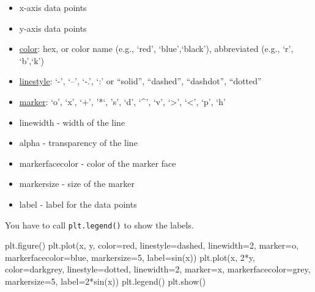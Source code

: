 \documentclass[
  letterpaper,
  DIV=11,
  numbers=noendperiod]{scrreprt}
\newenvironment{Shaded}{\begin{snugshade}}{\end{snugshade}}
\newcommand{\DecValTok}[1]{\textcolor[rgb]{0.68,0.00,0.00}{#1}}
\newcommand{\NormalTok}[1]{\textcolor[rgb]{0.00,0.23,0.31}{#1}}
\newcommand{\OperatorTok}[1]{\textcolor[rgb]{0.37,0.37,0.37}{#1}}
\newcommand{\StringTok}[1]{\textcolor[rgb]{0.13,0.47,0.30}{#1}}
\providecommand{\tightlist}{%
  \setlength{\itemsep}{0pt}\setlength{\parskip}{0pt}}\usepackage{longtable,booktabs,array}
\begin{document}
\begin{itemize}
\tightlist
\item
  x-axis data points
\item
  y-axis data points
\item
  \href{https://matplotlib.org/stable/users/explain/colors/colors.html}{color}:
  hex, or color name (e.g., `red', `blue',`black'), abbreviated (e.g.,
  `r', `b',`k')
\item
  \href{https://matplotlib.org/stable/gallery/lines_bars_and_markers/linestyles.html}{linestyle}:
  `-', `--', `-.', `:' or ``solid'', ``dashed'', ``dashdot'', ``dotted''
\item
  \href{https://matplotlib.org/stable/api/markers_api.html}{marker}:
  `o', `x', `+', '*`, 's', `d', `\^{}', `v', `\textgreater{}',
  `\textless{}', `p', `h'
\item
  linewidth - width of the line
\item
  alpha - transparency of the line
\item
  markerfacecolor - color of the marker face
\item
  markersize - size of the marker
\item
  label - label for the data points
\end{itemize}

You have to call \texttt{plt.legend()} to show the labels.

\begin{Shaded}
\begin{Highlighting}[]
\NormalTok{plt.figure()}
\NormalTok{plt.plot(x, y, color}\OperatorTok{=}\StringTok{\textquotesingle{}red\textquotesingle{}}\NormalTok{, linestyle}\OperatorTok{=}\StringTok{\textquotesingle{}dashed\textquotesingle{}}\NormalTok{, linewidth}\OperatorTok{=}\DecValTok{2}\NormalTok{, marker}\OperatorTok{=}\StringTok{\textquotesingle{}o\textquotesingle{}}\NormalTok{, }
\NormalTok{            markerfacecolor}\OperatorTok{=}\StringTok{\textquotesingle{}blue\textquotesingle{}}\NormalTok{, markersize}\OperatorTok{=}\DecValTok{5}\NormalTok{,}
\NormalTok{            label}\OperatorTok{=}\StringTok{\textquotesingle{}sin(x)\textquotesingle{}}\NormalTok{)}
\NormalTok{plt.plot(x, }\DecValTok{2}\OperatorTok{*}\NormalTok{y, color}\OperatorTok{=}\StringTok{\textquotesingle{}darkgrey\textquotesingle{}}\NormalTok{, linestyle}\OperatorTok{=}\StringTok{\textquotesingle{}dotted\textquotesingle{}}\NormalTok{, linewidth}\OperatorTok{=}\DecValTok{2}\NormalTok{, marker}\OperatorTok{=}\StringTok{\textquotesingle{}x\textquotesingle{}}\NormalTok{,}
\NormalTok{            markerfacecolor}\OperatorTok{=}\StringTok{\textquotesingle{}grey\textquotesingle{}}\NormalTok{, markersize}\OperatorTok{=}\DecValTok{5}\NormalTok{,}
\NormalTok{            label}\OperatorTok{=}\StringTok{\textquotesingle{}2*sin(x)\textquotesingle{}}\NormalTok{)}
\NormalTok{plt.legend()}
\NormalTok{plt.show()}
\end{Highlighting}
\end{Shaded}
\end{document}
